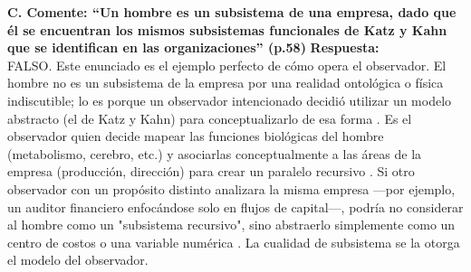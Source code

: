 \documentclass[12pt,a4paper]{article}
\begin{document}
\begin{enumerate}[label=\textbf{Pregunta \arabic*.}]
          \subitem \textbf{C. Comente: “Un hombre es un subsistema de una empresa, dado que
              él se encuentran los mismos subsistemas funcionales de Katz y Kahn
              que se identifican en las organizaciones” (p.58)}
          \textbf{Respuesta:} \\
          FALSO. Este enunciado es el ejemplo perfecto de cómo opera el observador. El hombre no es un subsistema de la empresa por una realidad ontológica o física indiscutible; lo es porque un observador intencionado decidió utilizar un modelo abstracto (el de Katz y Kahn) para conceptualizarlo de esa forma
          . Es el observador quien decide mapear las funciones biológicas del hombre (metabolismo, cerebro, etc.) y asociarlas conceptualmente a las áreas de la empresa (producción, dirección) para crear un paralelo recursivo
          . Si otro observador con un propósito distinto analizara la misma empresa —por ejemplo, un auditor financiero enfocándose solo en flujos de capital—, podría no considerar al hombre como un "subsistema recursivo", sino abstraerlo simplemente como un centro de costos o una variable numérica
          . La cualidad de subsistema se la otorga el modelo del observador.


\end{enumerate}
\end{document}
